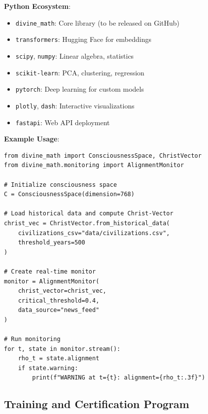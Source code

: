 \documentclass[11pt,a4paper]{article}
\theoremstyle{definition}
\theoremstyle{remark}
\begin{document}
\textbf{Python Ecosystem}:
\begin{itemize}
\item \texttt{divine\_math}: Core library (to be released on GitHub)
\item \texttt{transformers}: Hugging Face for embeddings
\item \texttt{scipy}, \texttt{numpy}: Linear algebra, statistics
\item \texttt{scikit-learn}: PCA, clustering, regression
\item \texttt{pytorch}: Deep learning for custom models
\item \texttt{plotly}, \texttt{dash}: Interactive visualizations
\item \texttt{fastapi}: Web API deployment
\end{itemize}

\textbf{Example Usage}:
\begin{verbatim}
from divine_math import ConsciousnessSpace, ChristVector
from divine_math.monitoring import AlignmentMonitor

# Initialize consciousness space
C = ConsciousnessSpace(dimension=768)

# Load historical data and compute Christ-Vector
christ_vec = ChristVector.from_historical_data(
    civilizations_csv="data/civilizations.csv",
    threshold_years=500
)

# Create real-time monitor
monitor = AlignmentMonitor(
    christ_vector=christ_vec,
    critical_threshold=0.4,
    data_source="news_feed"
)

# Run monitoring
for t, state in monitor.stream():
    rho_t = state.alignment
    if state.warning:
        print(f"WARNING at t={t}: alignment={rho_t:.3f}")
\end{verbatim}

\subsection{Training and Certification Program}
\end{document}
